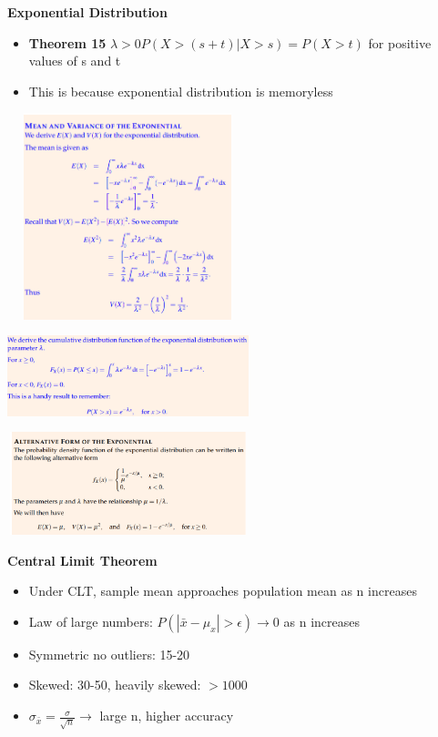 \documentclass[10pt, landscape]{article}
\begin{document}
\begin{multicols}{4}
\textbf{Exponential Distribution} \newline
\begin{itemize}
  \item \textbf{Theorem 15} $\lambda>0 P(X>(s+t)|X>s)=P(X>t)$ for positive values of s and t
  \item This is because exponential distribution is memoryless 
\end{itemize}
\includegraphics[width=7cm, height=6cm]{exp_mean_Var.png}
\includegraphics[width=7cm, height=3cm]{exp2.png}
\includegraphics[width=7cm, height=3cm]{exp3.png}

\textbf{Central Limit Theorem} \newline
\begin{itemize}
  \item Under CLT, sample mean approaches population mean as n increases
  \item Law of large numbers: $P(|\bar{x}-\mu_x|>\epsilon) \rightarrow 0$ as n increases
  \item Symmetric no outliers: 15-20
  \item Skewed: 30-50, heavily skewed: $>1000$
  \item $\sigma_{\bar{x}} = \frac{\sigma}{\sqrt{n}} \rightarrow$ large n, higher accuracy 
\end{itemize}



\end{multicols}
\end{document}
